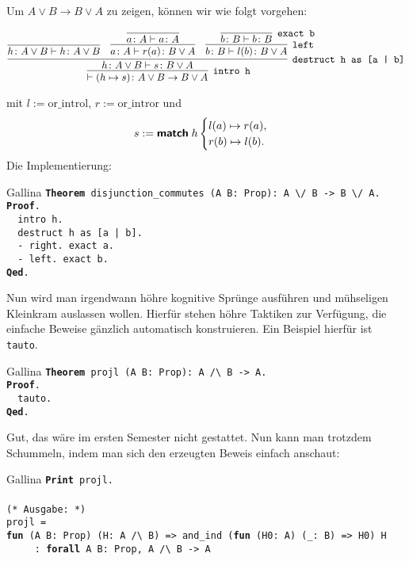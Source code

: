 \documentclass[8pt]{beamer}
\newcommand{\strong}[1]{\textsf{\textbf{#1}}}
\newcommand{\cond}{\rightarrow}
\newcommand{\kw}[1]{\textbf{#1}}
\begin{document}
\begin{frame}
Um $A\lor B\cond B\lor A$ zu zeigen, können wir wie folgt vorgehen:
\begin{small}
\[
\infer[\texttt{intro h}]{\vdash (h\mapsto s)\colon A\lor B\to B\lor A}{
  \infer[\texttt{destruct h as [a | b]}]{h\colon A\lor B\vdash s\colon B\lor A}{
    \infer{h\colon A\lor B\vdash h\colon A\lor B}{}
  & \infer{a\colon A\vdash r(a)\colon B\lor A}{
      \infer{a\colon A\vdash a\colon A}{}}
  & \infer[\texttt{left}]{b\colon B\vdash l(b)\colon B\lor A}{
      \infer[\texttt{exact b}]{b\colon B\vdash b\colon B}{}}}}
\]
\end{small}
mit $l := \mathrm{or\_introl}$, $r := \mathrm{or\_intror}$ und
\[s := \strong{match}\;h\begin{cases}
l(a)\mapsto r(a),\\
r(b)\mapsto l(b).
\end{cases}
\]\pause
Die Implementierung:
\begin{block}{Gallina}
\texttt{\kw{Theorem} disjunction\_commutes (A B: Prop): A {\textbackslash}/ B -> B {\textbackslash}/ A.\\
\kw{Proof}.\\
\ \ intro h.\\
\ \ destruct h as [a | b].\\
\ \ - right. exact a.\\
\ \ - left.  exact b.\\
\kw{Qed}.}
\end{block}
\end{frame}

\begin{frame}
Nun wird man irgendwann höhre kognitive Sprünge ausführen und
mühseligen Kleinkram auslassen wollen. Hierfür stehen höhre Taktiken
zur Verfügung, die einfache Beweise gänzlich automatisch konstruieren.
Ein Beispiel hierfür ist \texttt{tauto}.\pause
\begin{block}{Gallina}
\texttt{\kw{Theorem} projl (A B: Prop): A /{\textbackslash} B -> A.\\
\kw{Proof}.\\
\ \ tauto.\\
\kw{Qed}.}
\end{block}\pause
Gut, das wäre im ersten Semester nicht gestattet. Nun kann man trotzdem
Schummeln, indem man sich den erzeugten Beweis einfach anschaut:
\begin{block}{Gallina}
\texttt{\kw{Print} projl.\\
\mbox{}\\
(* Ausgabe: *)\\
projl = \\
\kw{fun} (A B: Prop) (H: A /{\textbackslash} B) => and\_ind (\kw{fun} (H0: A) (\_: B) => H0) H\\
\ \ \ \ \ : \kw{forall} A B: Prop, A /{\textbackslash} B -> A}
\end{block}
\end{frame}
\end{document}
